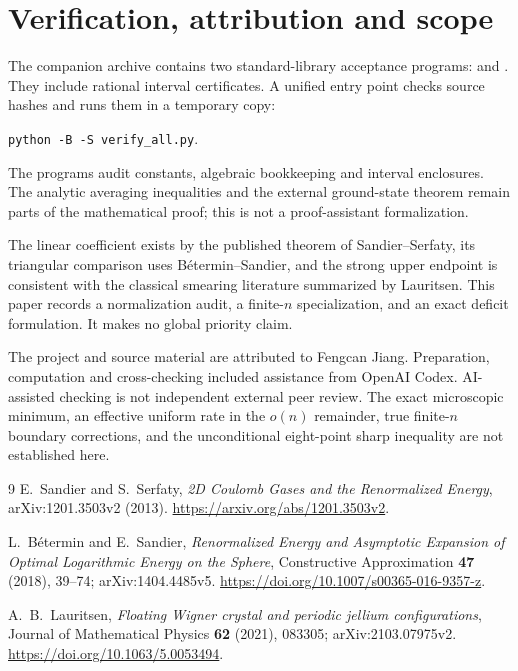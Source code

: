 \documentclass[11pt,a4paper]{article}
\theoremstyle{remark}
\numberwithin{equation}{section}
\begin{document}
\section{Verification, attribution and scope}
The companion archive contains two standard-library acceptance programs:
 and .
They include rational interval certificates. A unified entry point
checks source hashes and runs them in a temporary copy:
\begin{center}
 \texttt{python -B -S verify\_all.py}.
\end{center}
The programs audit constants, algebraic bookkeeping and interval
enclosures. The analytic averaging inequalities and the external
ground-state theorem remain parts of the mathematical proof; this is
not a proof-assistant formalization.

The linear coefficient exists by the published theorem of
Sandier--Serfaty, its triangular comparison uses
B\'etermin--Sandier, and the strong upper endpoint is consistent with
the classical smearing literature summarized by Lauritsen.
This paper records a normalization audit, a finite-\(n\) specialization,
and an exact deficit formulation. It makes no global priority claim.

The project and source material are attributed to Fengcan Jiang.
Preparation, computation and cross-checking included assistance from
OpenAI Codex. AI-assisted checking is not independent external peer
review. The exact microscopic minimum, an effective uniform rate in the
\(o(n)\) remainder, true finite-\(n\) boundary corrections, and the
unconditional eight-point sharp inequality are not established here.

\begin{thebibliography}{9}
E.~Sandier and S.~Serfaty,
\emph{2D Coulomb Gases and the Renormalized Energy},
arXiv:1201.3503v2 (2013).
\url{https://arxiv.org/abs/1201.3503v2}.

L.~B\'etermin and E.~Sandier,
\emph{Renormalized Energy and Asymptotic Expansion of Optimal
Logarithmic Energy on the Sphere},
Constructive Approximation \textbf{47} (2018), 39--74;
arXiv:1404.4485v5.
\url{https://doi.org/10.1007/s00365-016-9357-z}.

A.~B.~Lauritsen,
\emph{Floating Wigner crystal and periodic jellium configurations},
Journal of Mathematical Physics \textbf{62} (2021), 083305;
arXiv:2103.07975v2.
\url{https://doi.org/10.1063/5.0053494}.
\end{thebibliography}
\end{document}
